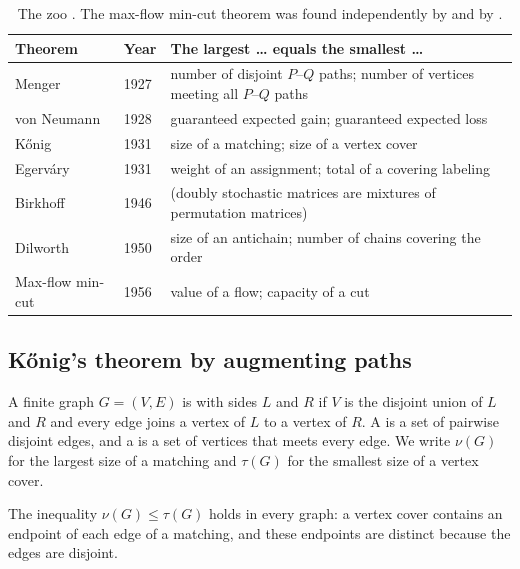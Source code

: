 \begin{refsection}
\begin{table}[t]
\centering\small
\begin{tabularx}{\linewidth}{@{}l l X@{}}
\toprule
Theorem & Year & The largest \dots{} equals the smallest \dots\\
\midrule
Menger & 1927 & number of disjoint $P$--$Q$ paths; number of vertices meeting all $P$--$Q$ paths\\
von Neumann & 1928 & guaranteed expected gain; guaranteed expected loss\\
K\H{o}nig & 1931 & size of a matching; size of a vertex cover\\
Egerv\'ary & 1931 & weight of an assignment; total of a covering labeling\\
Birkhoff & 1946 & (doubly stochastic matrices are mixtures of permutation matrices)\\
Dilworth & 1950 & size of an antichain; number of chains covering the order\\
Max-flow min-cut & 1956 & value of a flow; capacity of a cut\\
\bottomrule
\end{tabularx}
\caption{The zoo \parencite{Menger1927,vonNeumann1928,Konig1931,Egervary1931,Birkhoff1946,Dilworth1950}. The max-flow min-cut theorem was found independently by \textcite{FordFulkerson1956} and by \textcite{EliasFeinsteinShannon1956}.}\label{tab:lpduality:zoo}
\end{table}

\subsection{K\H{o}nig's theorem by augmenting paths}

\begin{definition}\label{def:lpduality:matching}
A finite graph $G=(V,E)$ is  with sides $L$ and $R$ if $V$ is the disjoint union of $L$ and $R$ and every edge joins a vertex of $L$ to a vertex of $R$. A  is a set of pairwise disjoint edges, and a  is a set of vertices that meets every edge. We write $\nu(G)$ for the largest size of a matching and $\tau(G)$ for the smallest size of a vertex cover.
\end{definition}

The inequality $\nu(G)\le\tau(G)$ holds in every graph: a vertex cover contains an endpoint of each edge of a matching, and these endpoints are distinct because the edges are disjoint.


\end{refsection}
